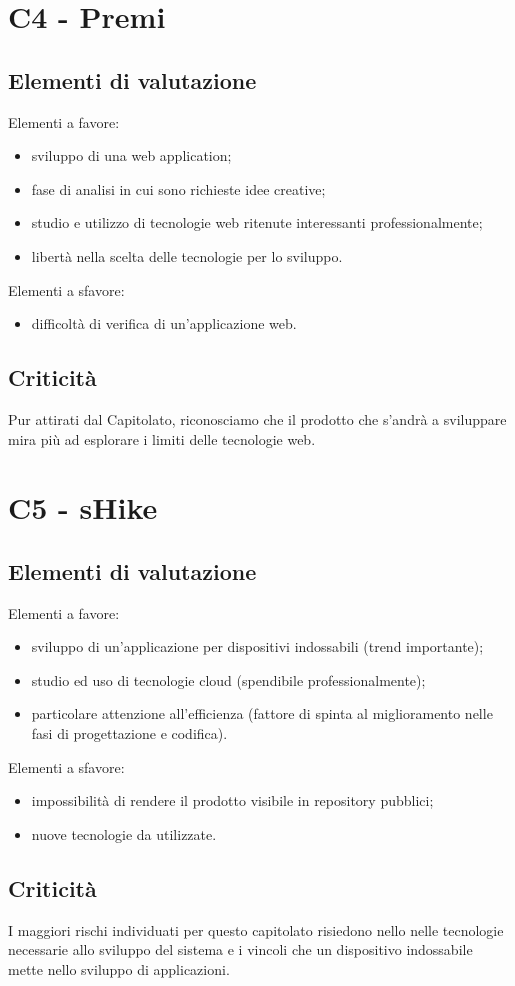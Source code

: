 \section{C4 - Premi}{
	\subsection{Elementi di valutazione}{
		Elementi a favore:
		\begin{itemize}
			\item sviluppo di una web application;
			\item fase di analisi in cui sono richieste idee creative;
			\item studio e utilizzo di tecnologie web ritenute interessanti professionalmente;
			\item libertà nella scelta delle tecnologie per lo sviluppo.
		\end{itemize}
		
		Elementi a sfavore:
		\begin{itemize}
			\item difficoltà di verifica di un'applicazione web.
		\end{itemize}
	}
	\subsection{Criticità}{
		Pur attirati dal Capitolato, riconosciamo che il prodotto che s'andrà a sviluppare mira più ad esplorare i limiti delle tecnologie web.
	}
}
\section{C5 - sHike}{
	\subsection{Elementi di valutazione}{
		Elementi a favore:
		\begin{itemize}
			\item sviluppo di un'applicazione per dispositivi indossabili (trend importante);
			\item studio ed uso di tecnologie cloud (spendibile professionalmente);
			\item particolare attenzione all'efficienza (fattore di spinta al miglioramento nelle fasi di progettazione e codifica).
		\end{itemize}
		
		Elementi a sfavore:
		\begin{itemize}
			\item impossibilità di rendere il prodotto visibile in repository pubblici;
			\item nuove tecnologie da utilizzate.
		\end{itemize}
	}
	\subsection{Criticità}{
		I maggiori rischi individuati per questo capitolato risiedono nello nelle tecnologie necessarie allo sviluppo del sistema e i vincoli che un dispositivo indossabile mette nello sviluppo di applicazioni. 
	}
}